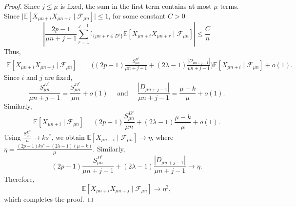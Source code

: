 \documentclass{article}
\numberwithin{equation}{section}
\newcommand{\FF}{\mbox{${\mathcal F}$}}
\newcommand{\I}{\mbox{${\mathbb I}$}}
\newcommand{\1}{\mathbf{1}}
\newcommand{\0}{\mathbf{0}}
\newcommand{\E}{\mbox{${\mathbb E}$}}
\begin{document}
\begin{proof}
Since $j\le \mu$ is fixed, the sum in the first term contains at most $\mu$ terms. Since $\vert \E[X_{\mu n+i}X_{\mu n+r}\mid \FF_{\mu n}] \vert
\leq 1$, for some constant $C>0$
\begin{equation*} 
\left|
\frac{2p-1}{\mu n+j-1}
\sum_{r=1}^{j-1}
\I_{\{\mu n+r\in D^c\}}
\E[X_{\mu n+i}X_{\mu n+r}\mid \FF_{\mu n}]
\right|
\le
\frac{C}{n}    
\end{equation*}
Thus,
\begin{align*}
\E[X_{\mu n+i}X_{\mu n+j}\mid \FF_{\mu n}]
&=
\Bigg(
(2p-1)\frac{S_{\mu n}^{D^c}}{\mu n+j-1}
+ (2\lambda-1)\frac{|D_{\mu n+j-1}|}{\mu n+j-1}
\Bigg)
\E[X_{\mu n+i}\mid \FF_{\mu n}] +o(1).
\end{align*}
Since $i$ and $j$ are fixed,
\[
\frac{S_{\mu n}^{D^c}}{\mu n+j-1} = \frac{S_{\mu n}^{D^c}}{\mu n} +o(1)
\quad \text{ and } \quad 
\frac{|D_{\mu n+j-1}|}{\mu n+j-1} =
\frac{\mu-k}{\mu}+o(1).
\]
Similarly,
\[ 
\E[X_{\mu n+i}\mid \FF_{\mu n}] = (2p-1)\frac{S_{\mu n}^{D^c}}{\mu n} + (2\lambda-1)\frac{\mu-k}{\mu}
+o(1).
\]
Using $\frac{S_{\mu n}^{D^c}}{n} \longrightarrow ks^*$, 
we obtain $\E[X_{\mu n+i}\mid \FF_{\mu n}]
\longrightarrow \eta$,
where $\eta = \frac{(2p-1)ks^*+(2\lambda-1)(\mu-k)}{\mu}$. Similarly, 
\[
(2p-1)\frac{S_{\mu n}^{D^c}}{\mu n+j-1}
+ (2\lambda-1)\frac{|D_{\mu n+j-1}|}{\mu n+j-1} \longrightarrow \eta.
\]
Therefore,
\[
\E[X_{\mu n+i}X_{\mu n+j}\mid \FF_{\mu n}]
\longrightarrow
\eta^2,
\]
which completes the proof.
\end{proof}
\end{document}
